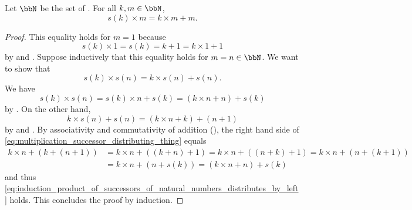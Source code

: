 \begin{lemma} \label{lemma:natural_number_successor_left_multiplication_recursion}
Let $\bbN$ be the set of . For all $k, m \in \bbN$,
$$s(k) \times m = k \times m + m.$$
\end{lemma}

\begin{proof}
    This equality holds for $m = 1$ because 
    $$s(k) \times 1 = s(k) = k+1 = k \times 1 + 1$$
    by  and .
    Suppose inductively that this equality holds for $m = n \in \bbN$. We want to show that 
    \begin{equation} \label{eq:induction_product_of_successors_of_natural_numbers_distributes_by_left}
    s(k) \times s(n) = k \times s(n) + s(n).
    \end{equation}
    We have 
    $$s(k) \times s(n) = s(k) \times n + s(k) = (k \times n + n) + s(k)$$
    by . On the other hand,
    \begin{equation} \label{eq:multiplication_successor_distributing_thing}
    k \times s(n) + s(n) = (k \times n + k) + (n+1)
    \end{equation}
    by  and . By associativity and commutativity of addition (), the right hand side of \eqref{eq:multiplication_successor_distributing_thing} equals
    \begin{align*}
    k \times n + (k + (n+1)) &= 
    k \times n + ((k + n)+1) =  
    k \times n + ((n + k)+1) =  
    k \times n + (n + (k+1)) \\
    &=  
    k \times n + (n + s(k)) =  
    (k \times n + n) + s(k)  
    \end{align*}
    and thus \eqref{eq:induction_product_of_successors_of_natural_numbers_distributes_by_left} holds. This concludes the proof by induction.
\end{proof}
